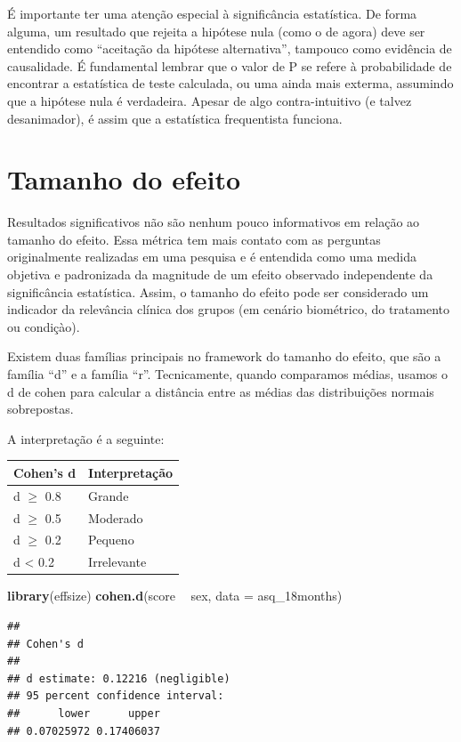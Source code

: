\documentclass[
]{book}
\newenvironment{Shaded}{\begin{snugshade}}{\end{snugshade}}
\newcommand{\DataTypeTok}[1]{\textcolor[rgb]{0.13,0.29,0.53}{#1}}
\newcommand{\KeywordTok}[1]{\textcolor[rgb]{0.13,0.29,0.53}{\textbf{#1}}}
\newcommand{\NormalTok}[1]{#1}
\newcommand{\OperatorTok}[1]{\textcolor[rgb]{0.81,0.36,0.00}{\textbf{#1}}}
\newcommand{\StringTok}[1]{\textcolor[rgb]{0.31,0.60,0.02}{#1}}
\begin{document}
É importante ter uma atenção especial à significância estatística. De forma alguma, um resultado que rejeita a hipótese nula (como o de agora) deve ser entendido como ``aceitação da hipótese alternativa'', tampouco como evidência de causalidade. É fundamental lembrar que o valor de P se refere à probabilidade de encontrar a estatística de teste calculada, ou uma ainda mais exterma, assumindo que a hipótese nula é verdadeira. Apesar de algo contra-intuitivo (e talvez desanimador), é assim que a estatística frequentista funciona.

\hypertarget{tamanho-do-efeito}{%
\section{Tamanho do efeito}\label{tamanho-do-efeito}}

Resultados significativos não são nenhum pouco informativos em relação ao tamanho do efeito. Essa métrica tem mais contato com as perguntas originalmente realizadas em uma pesquisa e é entendida como uma medida objetiva e padronizada da magnitude de um efeito observado independente da significância estatística. Assim, o tamanho do efeito pode ser considerado um indicador da relevância clínica dos grupos (em cenário biométrico, do tratamento ou condiçào).

Existem duas famílias principais no framework do tamanho do efeito, que são a família ``d'' e a família ``r''. Tecnicamente, quando comparamos médias, usamos o d de cohen para calcular a distância entre as médias das distribuições normais sobrepostas.

A interpretação é a seguinte:

\begin{longtable}[]{@{}ll@{}}
\toprule
Cohen's d & Interpretação\tabularnewline
\midrule
\endhead
d \(\geq\) 0.8 & Grande\tabularnewline
d \(\geq\) 0.5 & Moderado\tabularnewline
d \(\geq\) 0.2 & Pequeno\tabularnewline
d \textless{} 0.2 & Irrelevante\tabularnewline
\bottomrule
\end{longtable}

\begin{Shaded}
\begin{Highlighting}[]
\KeywordTok{library}\NormalTok{(effsize)}
\KeywordTok{cohen.d}\NormalTok{(score }\OperatorTok{~}\StringTok{ }\NormalTok{sex, }\DataTypeTok{data =}\NormalTok{ asq_18months)}
\end{Highlighting}
\end{Shaded}

\begin{verbatim}
## 
## Cohen's d
## 
## d estimate: 0.12216 (negligible)
## 95 percent confidence interval:
##      lower      upper 
## 0.07025972 0.17406037
\end{verbatim}
\end{document}
